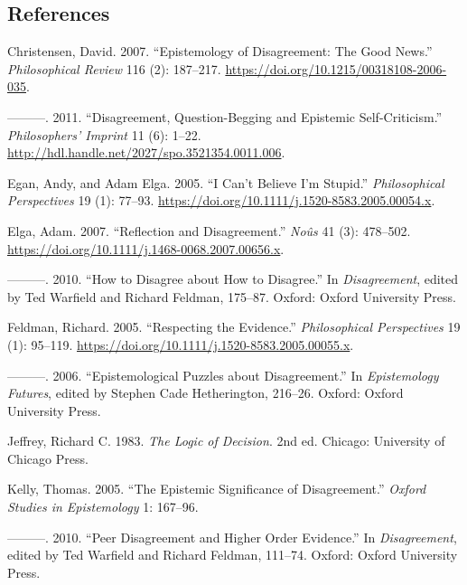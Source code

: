 \documentclass[
  11pt,
  letterpaper,
  DIV=11,
  numbers=noendperiod,
  oneside]{scrartcl}
\newlength{\cslhangindent}
\newenvironment{CSLReferences}[2] %
 {\begin{list}{}{%
  \setlength{\itemindent}{0pt}
  \setlength{\leftmargin}{0pt}
  \setlength{\parsep}{0pt}
  \ifodd #1
   \setlength{\leftmargin}{\cslhangindent}
   \setlength{\itemindent}{-1\cslhangindent}
  \fi
  \setlength{\itemsep}{#2\baselineskip}}}
 {\end{list}}
\begin{document}
\subsection*{References}\label{references}

\label{refs}
\begin{CSLReferences}{1}{0}
Christensen, David. 2007. {``Epistemology of Disagreement: The Good
News.''} \emph{Philosophical Review} 116 (2): 187--217.
\url{https://doi.org/10.1215/00318108-2006-035}.

---------. 2011. {``Disagreement, Question-Begging and Epistemic
Self-Criticism.''} \emph{Philosophers' Imprint} 11 (6): 1--22.
\url{http://hdl.handle.net/2027/spo.3521354.0011.006}.

Egan, Andy, and Adam Elga. 2005. {``{I Can't Believe I'm Stupid}.''}
\emph{Philosophical Perspectives} 19 (1): 77--93.
\url{https://doi.org/10.1111/j.1520-8583.2005.00054.x}.

Elga, Adam. 2007. {``Reflection and Disagreement.''} \emph{No{û}s} 41
(3): 478--502. \url{https://doi.org/10.1111/j.1468-0068.2007.00656.x}.

---------. 2010. {``How to Disagree about How to Disagree.''} In
\emph{Disagreement}, edited by Ted Warfield and Richard Feldman,
175--87. Oxford: Oxford University Press.

Feldman, Richard. 2005. {``Respecting the Evidence.''}
\emph{Philosophical Perspectives} 19 (1): 95--119.
\url{https://doi.org/10.1111/j.1520-8583.2005.00055.x}.

---------. 2006. {``Epistemological Puzzles about Disagreement.''} In
\emph{Epistemology Futures}, edited by Stephen Cade Hetherington,
216--26. Oxford: Oxford University Press.

Jeffrey, Richard C. 1983. \emph{The Logic of Decision}. 2nd ed. Chicago:
University of Chicago Press.

Kelly, Thomas. 2005. {``The Epistemic Significance of Disagreement.''}
\emph{Oxford Studies in Epistemology} 1: 167--96.

---------. 2010. {``Peer Disagreement and Higher Order Evidence.''} In
\emph{Disagreement}, edited by Ted Warfield and Richard Feldman,
111--74. Oxford: Oxford University Press.


\end{CSLReferences}
\end{document}
